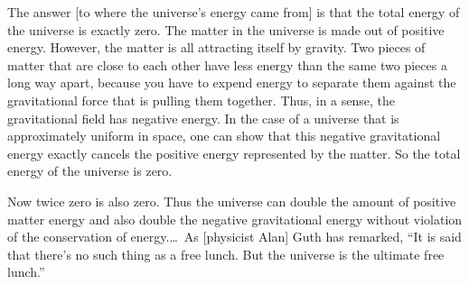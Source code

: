 \documentclass[letterpaper,12pt]{article}
\newcounter{HawkingEnergyZ}
\newenvironment{squotation}
  {\small\quotation}
  {\endquotation\normalsize}
\begin{document}
\begin{squotation}
The\label{HawkingEnergy} answer [to where the universe's energy came from] is that the total energy of the universe is exactly zero. The matter in the universe is made out of positive energy. However, the matter is all attracting itself by gravity. Two pieces of matter that are close to each other have less energy than the same two pieces a long way apart, because you have to expend energy to separate them against the gravitational force that is pulling them together. Thus, in a sense, the gravitational field has negative energy. In the case of a universe that is approximately uniform in space, one can show that this negative gravitational energy exactly cancels the positive energy represented by the matter. So the total energy of the universe is zero.

Now twice zero is also zero. Thus the universe can double the amount of positive matter energy and also double the negative gravitational energy without violation of the conservation of energy.\thinspace\ldots\ As [physicist Alan] Guth has remarked, ``It is said that there's no such thing as a free lunch. But the universe is the ultimate free lunch.''
\end{squotation}
\end{document}

